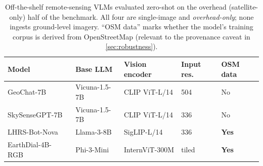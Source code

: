 \documentclass[runningheads]{llncs}
\begin{document}
\begin{table}[t]
  \centering
  \caption{Off-the-shelf remote-sensing VLMs evaluated zero-shot on the overhead
  (satellite-only) half of the benchmark. All four are single-image and
  \emph{overhead-only}; none ingests ground-level imagery. ``OSM data'' marks whether
  the model's training corpus is derived from OpenStreetMap (relevant to the
  provenance caveat in \cref{sec:robustness}).}
  \label{tab:models}
  \setlength{\tabcolsep}{4pt}
  \begin{tabular}{@{}lllll@{}}
    \toprule
    Model & Base LLM & Vision encoder & Input res. & OSM data \\
    \midrule
    GeoChat-7B~\cite{geochat2024}       & Vicuna-1.5-7B & CLIP ViT-L/14 & 504 & No \\
    SkySenseGPT-7B~\cite{skysensegpt2024} & Vicuna-1.5-7B & CLIP ViT-L/14 & 336 & No \\
    LHRS-Bot-Nova~\cite{lhrsbotnova2025}  & Llama-3-8B    & SigLIP-L/14   & 336 & \textbf{Yes} \\
    EarthDial-4B-RGB~\cite{earthdial2025} & Phi-3-Mini    & InternViT-300M & tiled & \textbf{Yes} \\
    \bottomrule
  \end{tabular}
\end{table}







\clearpage




\end{document}
